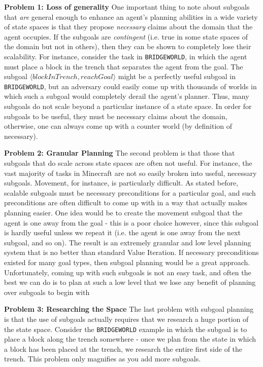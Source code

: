 \documentclass[]{article}
\begin{document}
{\bf Problem 1: Loss of generality}  One important thing to note about subgoals 
that {\it are} general enough to enhance an agent's planning abilities in a wide 
variety of state spaces is that they propose {\it necessary} claims about the 
domain that the agent occupies. If the subgoals are {\it contingent} (i.e. true in 
some state spaces of the domain but not in others), then they can be shown to 
completely lose their scalability. For instance, consider the task in \texttt{BRIDGEWORLD}, 
in which the agent must place a block in the trench that separates the agent from the goal. 
The subgoal $\langle blockInTrench, reachGoal\rangle$ might be a perfectly useful 
subgoal in \texttt{BRIDGEWORLD}, but an adversary could easily come up with 
thousands of worlds in which such a subgoal would completely derail the agent's 
planner. Thus, many subgoals do not scale beyond a particular instance of a state 
space. In order for subgoals to be useful, they must be necessary claims about the 
domain, otherwise, one can always come up with a counter world (by definition of necessary). 

{\bf Problem 2: Granular Planning} The second problem is that those that subgoals 
that do scale across state spaces are often not useful. For instance, the vast majority 
of tasks in Minecraft are not so easily broken into useful, necessary subgoals. 
Movement, for instance, is particularly difficult. As stated before, scalable subgoals 
must be necessary preconditions for a particular goal, and such preconditions are 
often difficult to come up with in a way that actually makes planning easier. One 
idea would be to create the movement subgoal that the agent is one away from 
the goal - this is a poor choice however, since this subgoal is hardly useful unless 
we repeat it (i.e. the agent is one away from the next subgoal, and so on). The 
result is an extremely granular and low level planning system that is no better 
than standard Value Iteration. If necessary preconditions existed for many goal 
types, then subgoal planning would be a great approach. Unfortunately, coming 
up with such subgoals is not an easy task, and often the best we can do is to 
plan at such a low level that we lose any benefit of planning over subgoals to begin with


{\bf Problem 3: Researching the Space} The last problem with subgoal planning 
is that the use of subgoals actually requires that we research a huge portion of 
the state space. Consider the \texttt{BRIDGEWORLD} example in which the 
subgoal is to place a block along the trench somewhere - once we plan from the 
state in which a block has been placed at the trench, we research the entire first 
side of the trench. This problem only magnifies as you add more subgoals.
\end{document}
